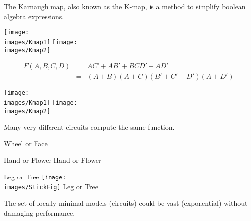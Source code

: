{The Karnaugh map, also known as the K-map, is a method to simplify boolean algebra expressions.

\vfil
\centerline{\texttt{[image: \\images/Kmap1]} \hspace{1.0in} \texttt{[image: \\images/Kmap2]}}

\begin{eqnarray*}
  F(A,B,C,D) & = & AC' + AB' + BCD' + AD' \\
  & = & (A+B)(A+C)(B' + C' + D')(A+D')
\end{eqnarray*}


\vfil
\centerline{\texttt{[image: \\images/Kmap1]} \hspace{1.0in} \texttt{[image: \\images/Kmap2]}}

Many very different circuits compute the same function.


{\color{red}
  
\centerline{Wheel or Face}

\vfill
\centerline{Hand or Flower \hspace{2.5in} Hand or Flower}

\vfill
\centerline{Leg or Tree  \texttt{[image: \\images/StickFig]} Leg or Tree}
}

\vfill
The set of locally minimal models (circuits) could be vast (exponential) without damaging performance.

}

